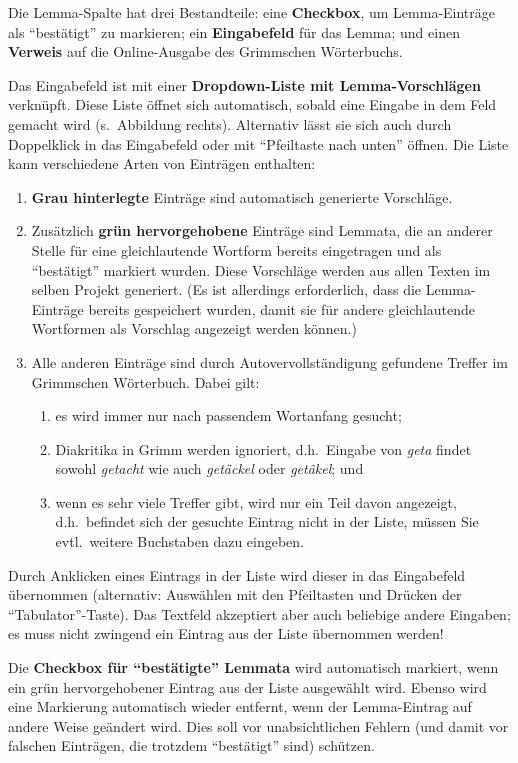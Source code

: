 \documentclass[11pt,a4paper,parskip=half]{scrartcl}
\begin{document}
Die Lemma-Spalte hat drei Bestandteile: eine \textbf{Checkbox}, um
Lemma-Einträge als "`bestätigt"' zu markieren; ein
\textbf{Eingabefeld} für das Lemma; und einen \textbf{Verweis} auf die
Online-Ausgabe des Grimmschen Wörterbuchs.

Das Eingabefeld ist mit einer \textbf{Dropdown-Liste mit
  Lemma-Vorschlägen} verknüpft.  Diese Liste öffnet sich automatisch,
sobald eine Eingabe in dem Feld gemacht wird (s.~Abbildung rechts).
Alternativ lässt sie sich auch durch Doppelklick in das Eingabefeld
oder mit "`Pfeiltaste nach unten"' öffnen.  Die Liste kann
verschiedene Arten von Einträgen enthalten:
\begin{enumerate}
\item \textbf{Grau hinterlegte} Einträge sind automatisch generierte
  Vorschläge.
\item Zusätzlich \textbf{grün hervorgehobene} Einträge sind Lemmata,
  die an anderer Stelle für eine gleichlautende Wortform bereits
  eingetragen und als "`bestätigt"' markiert wurden.  Diese Vorschläge
  werden aus allen Texten im selben Projekt generiert.  (Es ist
  allerdings erforderlich, dass die Lemma-Einträge bereits gespeichert
  wurden, damit sie für andere gleichlautende Wortformen als Vorschlag
  angezeigt werden können.)
\item Alle anderen Einträge sind durch Autovervollständigung gefundene Treffer im Grimmschen Wörterbuch. Dabei gilt:
  \begin{enumerate}
  \item es wird immer nur nach passendem Wortanfang gesucht;
  \item Diakritika in Grimm werden ignoriert, d.h.\ Eingabe von
    \emph{geta} findet sowohl \emph{getacht} wie auch \emph{getäckel}
    oder \emph{getâkel}; und
  \item wenn es sehr viele Treffer gibt, wird nur ein Teil davon
    angezeigt, d.h.\ befindet sich der gesuchte Eintrag nicht in der
    Liste, müssen Sie evtl.\ weitere Buchstaben dazu eingeben.
  \end{enumerate}
\end{enumerate}

Durch Anklicken eines Eintrags in der Liste wird dieser in das
Eingabefeld übernommen (alternativ: Auswählen mit den Pfeiltasten und
Drücken der "`Tabulator"'-Taste).  Das Textfeld akzeptiert aber auch
beliebige andere Eingaben; es muss nicht zwingend ein Eintrag aus der
Liste übernommen werden!

Die \textbf{Checkbox für "`bestätigte"' Lemmata} wird automatisch markiert,
wenn ein grün hervorgehobener Eintrag aus der Liste ausgewählt wird.
Ebenso wird eine Markierung automatisch wieder entfernt, wenn der
Lemma-Eintrag auf andere Weise geändert wird.  Dies soll vor
unabsichtlichen Fehlern (und damit vor falschen Einträgen, die
trotzdem "`bestätigt"' sind) schützen.
\end{document}

